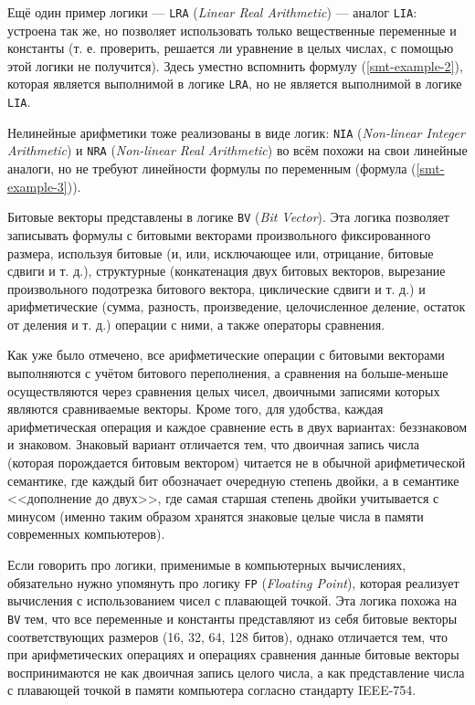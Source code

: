 Ещё один пример логики --- \texttt{LRA} (\textit{Linear Real Arithmetic}) --- аналог \texttt{LIA}: устроена так же, но позволяет использовать только вещественные переменные и константы (т. е. проверить, решается ли уравнение в целых числах, с помощью этой логики не получится). Здесь уместно вспомнить формулу (\ref{smt-example-2}), которая является выполнимой в логике \texttt{LRA}, но не является выполнимой в логике \texttt{LIA}.

Нелинейные арифметики тоже реализованы в виде логик: \texttt{NIA} (\textit{Non-linear Integer Arithmetic}) и \texttt{NRA} (\textit{Non-linear Real Arithmetic}) во всём похожи на свои линейные аналоги, но не требуют линейности формулы по переменным (формула (\ref{smt-example-3})).

Битовые векторы представлены в логике \texttt{BV} (\textit{Bit Vector}). Эта логика позволяет записывать формулы с битовыми векторами произвольного фиксированного размера, используя битовые (и, или, исключающее или, отрицание, битовые сдвиги и т. д.), структурные (конкатенация двух битовых векторов, вырезание произвольного подотрезка битового вектора, циклические сдвиги и т. д.) и арифметические (сумма, разность, произведение, целочисленное деление, остаток от деления и т. д.) операции с ними, а также операторы сравнения.

Как уже было отмечено, все арифметические операции с битовыми векторами выполняются с учётом битового переполнения, а сравнения на больше-меньше осуществляются через сравнения целых чисел, двоичными записями которых являются сравниваемые векторы. Кроме того, для удобства, каждая арифметическая операция и каждое сравнение есть в двух вариантах: беззнаковом и знаковом. Знаковый вариант отличается тем, что двоичная запись числа (которая порождается битовым вектором) читается не в обычной арифметической семантике, где каждый бит обозначает очередную степень двойки, а в семантике <<дополнение до двух>>, где самая старшая степень двойки учитывается с минусом (именно таким образом хранятся знаковые целые числа в памяти современных компьютеров).

Если говорить про логики, применимые в компьютерных вычислениях, обязательно нужно упомянуть про логику \texttt{FP} (\textit{Floating Point}), которая реализует вычисления с использованием чисел с плавающей точкой. Эта логика похожа на \texttt{BV} тем, что все переменные и константы представляют из себя битовые векторы соответствующих размеров (16, 32, 64, 128 битов), однако отличается тем, что при арифметических операциях и операциях сравнения данные битовые векторы воспринимаются не как двоичная запись целого числа, а как представление числа с плавающей точкой в памяти компьютера согласно стандарту IEEE-754.

